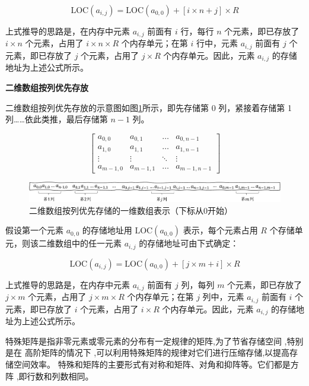 \documentclass[lang=cn,newtx,10pt,scheme=chinese]{elegantbook}
\begin{document}
\begin{equation}
\text{LOC}(a_{i,j}) = \text{LOC}(a_{0,0}) + [i \times n + j] \times R
\end{equation}

上式推导的思路是，在内存中元素 $a_{i,j}$ 前面有 $i$ 行，每行 $n$ 个元素，即已存放了 $i \times n$ 个元素，占用了 $i \times n \times R$ 个内存单元；在第 $i$ 行中，元素 $a_{i,j}$ 前面有 $j$ 个元素，即已存放了 $j$ 个元素，占用了 $j \times R$ 个内存单元。因此，元素 $a_{i,j}$ 的存储地址为上述公式所示。

\textbf{二维数组按列优先存放}

二维数组按列优先存放的示意图如图\ref{fig:column_major_array}所示，即先存储第 0 列，紧接着存储第 1 列……依此类推，最后存储第 $n-1$ 列。

\[
\begin{bmatrix}
a_{0,0} & a_{0,1} & \dots & a_{0,n-1} \\
a_{1,0} & a_{1,1} & \dots & a_{1,n-1} \\
\vdots & \vdots & \ddots & \vdots \\
a_{m-1,0} & a_{m-1,1} & \dots & a_{m-1,n-1}
\end{bmatrix}
\]

\begin{figure}[h]
  \centering
  \includegraphics[width=1\textwidth]{./figure/pdf/cropped/columnFirst.pdf}
  \caption{二维数组按列优先存储的一维数组表示（下标从0开始）}
  \label{fig:column_major_array}
\end{figure}

假设第一个元素 $a_{0,0}$ 的存储地址用 $\text{LOC}(a_{0,0})$ 表示，每个元素占用 $R$ 个存储单元，则该二维数组中的任一元素 $a_{i,j}$ 的存储地址可由下式确定：

\begin{equation}
\text{LOC}(a_{i,j}) = \text{LOC}(a_{0,0}) + [j \times m + i] \times R
\end{equation}

上式推导的思路是，在内存中元素 $a_{i,j}$ 前面有 $j$ 列，每列 $m$ 个元素，即已存放了 $j \times m$ 个元素，占用了 $j \times m \times R$ 个内存单元；在第 $j$ 列中，元素 $a_{i,j}$ 前面有 $i$ 个元素，即已存放了 $i$ 个元素，占用了 $i \times R$ 个内存单元。因此，元素 $a_{i,j}$ 的存储地址为上述公式所示。

特殊矩阵是指非零元素或零元素的分布有一定规律的矩阵,为了节省存储空间 ,特别是在
高阶矩阵的情况下 ,可以利用特殊矩阵的规律对它们进行压缩存储,以提高存储空间效率。
特殊和矩阵的主要形式有对称和矩阵、对角和抑阵等。它们都是方阵 ,即行数和列数相同。
\end{document}
